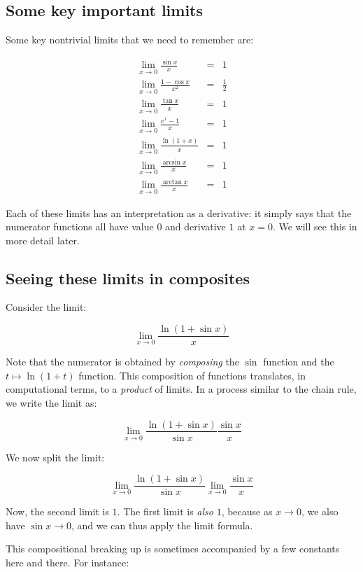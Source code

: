 \documentclass{amsart}
\begin{document}
\subsection{Some key important limits}

Some key nontrivial limits that we need to remember are:

\begin{eqnarray*}
  \lim_{x \to 0} \frac{\sin x}{x} & = & 1\\
  \lim_{x \to 0} \frac{1 - \cos x}{x^2} & = & \frac{1}{2}\\
  \lim_{x \to 0} \frac{\tan x}{x} & = & 1 \\
  \lim_{x \to 0} \frac{e^x - 1}{x} & = & 1 \\
  \lim_{x \to 0} \frac{\ln(1 + x)}{x} & = & 1\\
  \lim_{x \to 0} \frac{\arcsin x}{x} & = & 1 \\
  \lim_{x \to 0} \frac{\arctan x}{x} & = & 1
\end{eqnarray*}

Each of these limits has an interpretation as a derivative: it simply
says that the numerator functions all have value $0$ and derivative
$1$ at $x = 0$. We will see this in more detail later.

\subsection{Seeing these limits in composites}

Consider the limit:

$$\lim_{x \to 0} \frac{\ln(1 + \sin x)}{x}$$

Note that the numerator is obtained by {\em composing} the $\sin$
function and the $t \mapsto \ln(1 + t)$ function. This composition of
functions translates, in computational terms, to a {\em product} of
limits. In a process similar to the chain rule, we write the limit as:

$$\lim_{x \to 0} \frac{\ln(1 + \sin x)}{\sin x} \frac{\sin x}{x}$$

We now split the limit:

$$\lim_{x \to 0} \frac{\ln(1 + \sin x)}{\sin x} \lim_{x \to 0} \frac{\sin x}{x}$$

Now, the second limit is $1$. The first limit is {\em also} $1$,
because as $x \to 0$, we also have $\sin x \to 0$, and we can thus
apply the limit formula.

This compositional breaking up is sometimes accompanied by a few
constants here and there. For instance:
\end{document}
